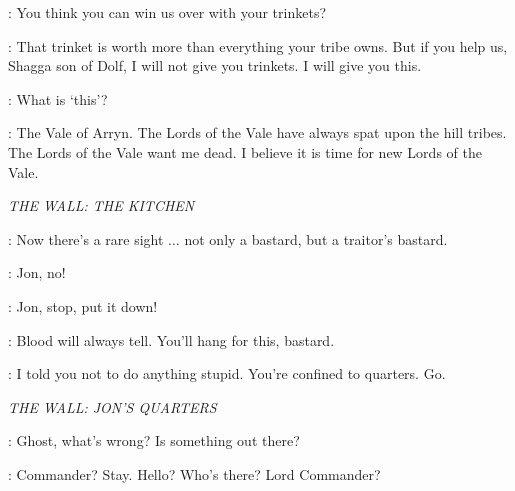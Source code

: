 
\SHAGGA: You think you can win us over with your trinkets? 


\TYRION: That trinket is worth more than everything your tribe owns. But if you help us, Shagga son of Dolf, I will not give you trinkets. I will give you this. 

\SHAGGA: What is `this'? 

\TYRION: The Vale of Arryn. The Lords of the Vale have always spat upon the hill tribes. The Lords of the Vale want me dead. I believe it is time for new Lords of the Vale. 


\scene

\textit{THE WALL: THE KITCHEN} 


\ALLISER: Now there's a rare sight $\ldots$ not only a bastard, but a traitor's bastard. 


\SAM: Jon, no! 

\PYP: Jon, stop, put it down! 

\ALLISER: Blood will always tell. You'll hang for this, bastard. 


\JEOR: I told you not to do anything stupid. You're confined to quarters. Go. 


\scene

\textit{THE WALL: JON'S QUARTERS} 


\JON: Ghost, what's wrong?  Is something out there? 


\JON: Commander?  Stay.  Hello? Who's there? Lord Commander? 


